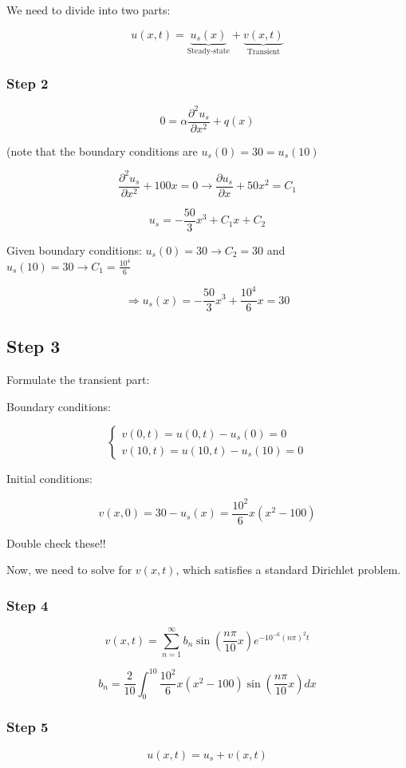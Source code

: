 \documentclass{article}
\begin{document}
We need to divide into two parts: 

$$u(x,t) = \underbrace{u_s (x)}_{\text{Steady-state}} + \underbrace{v(x,t)}_{\text{Transient}}$$

\subsubsection{Step 2}

$$0 = \alpha \frac{\partial^2 u_s}{\partial x^2} + q(x)$$

(note that the boundary conditions are $u_s(0) = 30 = u_s(10)$

$$\frac{\partial^2 u_s}{\partial x^2} + 100x = 0 \longrightarrow \frac{\partial u_s}{\partial x} + 50 x^2 = C_1$$

$$u_s = - \frac{50}{3} x^3 + C_1 x + C_2$$

Given boundary conditions: $u_s(0) = 30 \longrightarrow C_2 = 30$ and $u_s(10) = 30 \longrightarrow C_1 = \frac{10^4}{6}$

$$\Rightarrow u_s(x) = - \frac{50}{3} x^3 + \frac{10^4}{6} x = 30$$

\subsection{Step 3}

Formulate the transient part:

Boundary conditions:

$$\left\{ \begin{matrix} v(0,t) = u(0,t) - u_s(0) = 0 \\ v(10,t) = u(10,t) - u_s(10) = 0 \end{matrix} \right.$$

Initial conditions:

$$v(x,0) = 30 - u_s (x) = \frac{10^2}{6} x (x^2 - 100)$$

Double check these!!

Now, we need to solve for $v(x,t)$, which satisfies a standard Dirichlet problem. 

\subsubsection{Step 4}

$$v(x,t) = \sum_{n = 1}^\infty b_n \sin \left( \frac{n \pi}{10} x \right) e^{- 10^{-6} (n \pi)^2 t}$$

$$b_n = \frac{2}{10} \int_0^{10} \frac{10^2}{6} x (x^2 - 100) \sin( \frac{n \pi}{10} x) dx$$

\subsubsection{Step 5}

$$u(x,t) = u_s + v(x,t)$$
\end{document}
